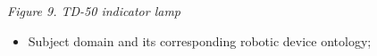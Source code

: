 \documentclass[10pt, letterpaper, twoside]{article}
\begin{document}
\begin{multicols}{2}
\begin{center}
\begin{minipage}{.4\textwidth}
\begin{center}
    \caption{\textsl{Figure 9. TD-50 indicator lamp}}
        \end{center}
    \label{fig:enter-label9}
\end{minipage}
\end{center}
\begin{itemize}[noitemsep]
\item Subject domain and its corresponding robotic device
ontology;
 \end{itemize}



\end{multicols}
\end{document}
